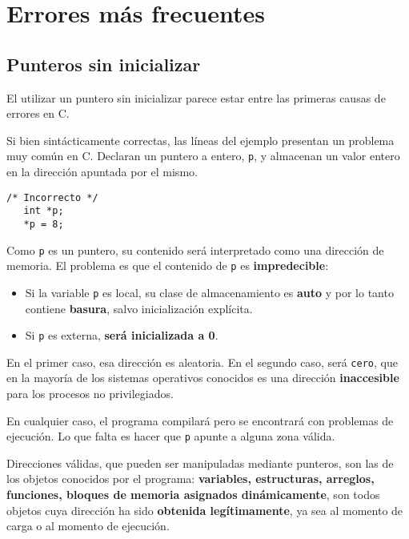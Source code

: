 




\section{Errores más frecuentes}

\subsection{Punteros sin inicializar}
El utilizar un puntero sin inicializar parece estar entre las primeras causas
de errores en C.

\begin{ejemplo}
Si bien sintácticamente correctas, las líneas del ejemplo presentan un problema
muy común en C. Declaran un puntero a entero, \lstinline{p}, y almacenan un valor entero en
la dirección apuntada por el mismo. 

\begin{lstlisting}
/* Incorrecto */
   int *p;
   *p = 8;
\end{lstlisting}   

Como \lstinline{p} es un puntero, su contenido será interpretado como una dirección de memoria. El problema es que el contenido de \lstinline{p} es \textbf{impredecible}:
\begin{itemize}
	\item Si la variable \lstinline{p} es local, su clase de almacenamiento es \textbf{auto} y
por lo tanto contiene \textbf{basura}, salvo inicialización explícita. 
	\item Si \lstinline{p} es externa, \textbf{será inicializada a 0}. 
\end{itemize}

En el primer caso, esa dirección es aleatoria. En el segundo caso, será \lstinline{cero}, que en la mayoría de los sistemas operativos conocidos es una dirección \textbf{inaccesible} para los procesos no privilegiados.  

En cualquier caso, el programa compilará pero se encontrará con problemas de ejecución. Lo que falta es hacer que \lstinline{p} apunte a alguna zona válida.

Direcciones válidas, que pueden ser manipuladas mediante punteros, son las de
los objetos conocidos por el programa: \textbf{variables, estructuras, arreglos,
funciones, bloques de memoria asignados dinámicamente}, son todos objetos cuya
dirección ha sido \textbf{obtenida legítimamente}, ya sea al momento de carga o al
momento de ejecución. 
\end{ejemplo}

